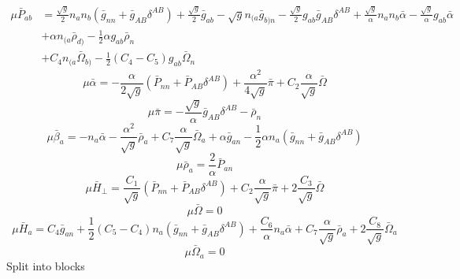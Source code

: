 \documentclass{article}
\begin{document}
\begin{align*}
\mu {\bar P}_{ab} & = \frac{\sqrt{g}}{2}n_{a}n_{b}\left({\bar g}_{nn} + {\bar g}_{AB}\delta^{AB}\right) + \frac{\sqrt{g}}{2}{\bar g}_{ab} - \sqrt{g}n_{(a}{\bar g}_{b)n} - \frac{\sqrt{g}}{2}g_{ab} {\bar g}_{AB}\delta^{AB} + \frac{\sqrt{g}}{\alpha}n_{a}n_{b}{\bar \alpha} - \frac{\sqrt{g}}{\alpha}g_{ab}{\bar \alpha} \\
& + \alpha n_{(a}{\bar \rho}_{d)} - \frac{1}{2}\alpha g_{ab}{\bar \rho}_{n}\\
& + C_{4}n_{(a}{\bar \Omega}_{b)} - \frac{1}{2}(C_{4} - C_{5})g_{ab}{\bar \Omega}_{n}
\end{align*}
\[
\mu {\bar \alpha} = -\frac{\alpha}{2\sqrt{g}}({\bar P}_{nn} + {\bar P}_{AB}\delta^{AB}) + \frac{\alpha^{2}}{4\sqrt{g}}{\bar \pi} + C_{2}\frac{\alpha}{\sqrt{g}}{\bar \Omega}
\]
\[
\mu {\bar \pi} = -\frac{\sqrt{g}}{\alpha} {\bar g}_{AB}\delta^{AB} - {\bar \rho}_{n}
\]
\[
\mu {\bar \beta}_{a} = - n_{a}{\bar \alpha} - \frac{\alpha^{2}}{\sqrt{g}}{\bar \rho}_{a} + C_{7}\frac{\alpha}{\sqrt{g}}{\bar \Omega}_{a} + \alpha{\bar g}_{an} - \frac{1}{2}\alpha n_{a}({\bar g}_{nn} + {\bar g}_{AB}\delta^{AB})
\]
\[
\mu {\bar \rho}_{a} = \frac{2}{\alpha} {\bar P}_{an}
\]
\[
\mu {\bar H}_{\perp} = \frac{C_{1}}{\sqrt{g}}\left({\bar P}_{nn} + {\bar P}_{AB}\delta^{AB}\right) + C_{2}\frac{\alpha}{\sqrt{g}}{\bar \pi} + 2\frac{C_{3}}{\sqrt{g}}{\bar \Omega}
\]
\[
\mu {\bar \Omega} = 0
\]
\[
\mu {\bar H}_{a} = C_{4}{\bar g}_{an} + \frac{1}{2}(C_{5} - C_{4})n_{a}({\bar g}_{nn} + {\bar g}_{AB}\delta^{AB}) + \frac{C_{6}}{\alpha}n_{a}{\bar \alpha} + C_{7}\frac{\alpha}{\sqrt{g}}{\bar \rho}_{a} + 2\frac{C_{8}}{\sqrt{g}}{\bar \Omega}_{a} 
\]
\[
\mu {\bar \Omega}_{a} = 0
\]
Split into blocks
\end{document}
